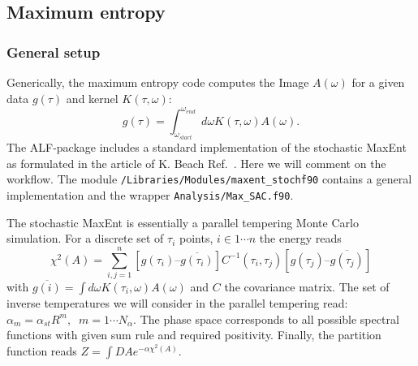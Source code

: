 

\subsection{Maximum entropy }

\subsubsection{General setup}
Generically, the maximum entropy code computes the  Image  $A(\omega) $ for a given  data $g(\tau) $  and kernel $K(\tau,\omega) $:
\begin{equation}
g(\tau) =  \int_{\omega_{start}}^{\omega_{end}} d {\omega} K(\tau,\omega) A(\omega).
\end{equation} 
The  ALF-package includes a standard implementation of the stochastic MaxEnt    as formulated in the article of K. Beach  Ref.~\cite{Beach04a}.  Here we will  comment on the workflow.  The module 
\texttt{/Libraries/Modules/maxent\_stoch\.f90} contains  a general implementation and  the wrapper  \texttt{Analysis/Max\_SAC.f90}. 

The stochastic MaxEnt is essentially a parallel tempering Monte Carlo simulation.    For a discrete set of $\tau_i$ points,  $i \in 1 \cdots n $ the energy reads
\begin{equation}
  \chi^{2}(A) =  \sum_{i,j=1}^{n}   \left[ g(\tau_i)  –    \overline{g(\tau_i)} \right] C^{-1}(\tau_i,\tau_j) \left[    g(\tau_j)  –  \overline{g(\tau_j)} \right] 
\end{equation} with $ \overline{g(i)} =\int d{\omega} K(\tau_{i},\omega)  A(\omega)$ and  $C$ the covariance matrix. 
The set  of inverse temperatures   we will consider  in the parallel tempering read:
$ \alpha_m = \alpha_{st}  R^{m}, \; \; m = 1 \cdots N_{\alpha} $.   The phase space corresponds to all possible spectral functions with given sum rule and required positivity.  Finally,  the partition function reads
$Z =  \int{DA} e^{-\alpha \chi^{2}(A)}$.  

